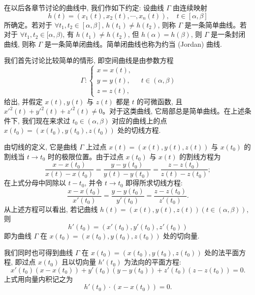 在以后各章节讨论的曲线中, 我们作如下约定: 设曲线 $\Gamma$ 由连续映射
\[
  h(t)=(x_1(t),x_2(t),\cdots,x_n(t)),\quad t\in[\alpha,\beta]
\]
所确定。若对于 $\forall t_1,t_2\in[\alpha,\beta]$, $h(t_1)\ne h(t_2)$, 则称 $\Gamma$ 是一条简单曲线。若对于 $\forall t_1,t_2\in[\alpha,\beta)$, 有 $h(t_1)\ne h(t_2)$, 但 $h(\alpha)=h(\beta)$, 则 $\Gamma$ 是一条封闭曲线, 则称 $\Gamma$ 是一条简单闭曲线。简单闭曲线也称为约当 (Jordan) 曲线.

我们首先讨论比较简单的情形, 即空间曲线是由参数方程
\[
  \Gamma:
  \begin{cases}
    x=x(t),\\
    y=y(t),\\
    z=z(t),
  \end{cases}
  \quad t\in(\alpha,\beta)
\]
给出, 并假定 $x(t),y(t)$ 与 $z(t)$ 都是 $t$ 的可微函数, 且 $x'^2(t)+y'^2(t)+z'^2(t)\ne0$。对于这类曲线, 它局部总是简单曲线。在上述条件下, 我们现在来求过 $t_0\in(\alpha,\beta)$ 对应的曲线上的点 $x(t_0)=(x(t_0),y(t_0),z(t_0))$ 处的切线方程.

由切线的定义, 它是曲线 $\Gamma$ 上过点 $x(t)=(x(t),y(t),z(t))$ 与 $x(t_0)$ 的割线当 $t\to t_0$ 时的极限位置。由于过点 $x(t_0)$ 与 $x(t)$ 的割线方程为
\[
  \frac{x-x(t_0)}{x(t)-x(t_0)}
  =
  \frac{y-y(t_0)}{y(t)-y(t_0)}
  =
  \frac{z-z(t_0)}{z(t)-z(t_0)};
\]
在上式分母中同除以 $t-t_0$, 并令 $t\to t_0$ 即得所求切线方程:
\[
  \frac{x-x(t_0)}{x'(t_0)}
  =
  \frac{y-y(t_0)}{y'(t_0)}
  =
  \frac{z-z(t_0)}{z'(t_0)}.
\]
从上述方程可以看出, 若记曲线 $h(t)=(x(t),y(t),z(t))(t\in(\alpha,\beta))$, 则
\[
  h'(t_0)=(x'(t_0),y'(t_0),z'(t_0))
\]
即为曲线 $\Gamma$ 在 $x(t_0)=(x(t_0),y(t_0),z(t_0))$ 处的切向量.

我们同时也可得到曲线 $\Gamma$ 在 $x(t_0)=(x(t_0),y(t_0),z(t_0))$ 处的法平面方程, 即过点 $x(t_0)$ 且以切向量 $h'(t_0)$ 为法向的平面方程:
\[
  x'(t_0)(x-x(t_0))+y'(t_0)(y-y(t_0))+z'(t_0)(z-z(t_0))=0.
\]
上式用向量内积记之为
\[
  h'(t_0)\cdot(x-x(t_0))=0.
\]

